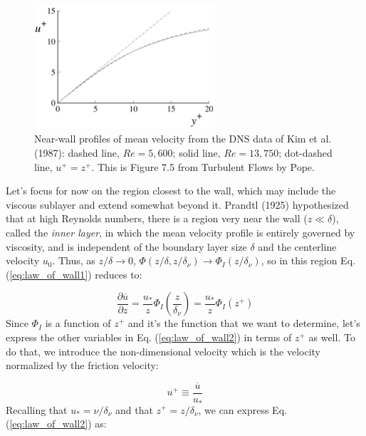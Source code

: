 \documentclass[12pt]{article}
\numberwithin{equation}{section}
\numberwithin{figure}{section}
\numberwithin{table}{section}
\begin{document}
\begin{figure}[h]
  \centering
  \includegraphics[width=0.6\textwidth]{assets/fig_law_of_the_wall_viscous_sublayer.png}
  \caption{
    Near-wall profiles of mean velocity from the DNS data of Kim et al. (1987):
    dashed line, $Re = 5,600$; solid line, $Re = 13,750$; dot-dashed line,
    $u^+ = z^+$.
    This is Figure 7.5 from Turbulent Flows by Pope.
  }
  \label{fig:law_of_the_wall_viscous_sublayer}
\end{figure}

Let's focus for now on the region closest to the wall, which may include the
viscous sublayer and extend somewhat beyond it.
Prandtl (1925) hypothesized that at high Reynolds numbers, there is a region
very near the wall ($z \ll \delta$), called the \textit{inner layer}, in which
the mean velocity profile is entirely governed by viscosity, and is independent
of the boundary layer size $\delta$ and the centerline velocity $u_0$.
Thus, as $z/\delta \to 0$, $\Phi(z/\delta, z/\delta_\nu) \to \Phi_I(z/\delta_\nu)$,
so in this region Eq. (\ref{eq:law_of_wall1}) reduces to:

\begin{equation}
  \frac{\partial \overline{u}}{\partial z} =
  \frac{u_*}{z} \Phi_I\left(\frac{z}{\delta_\nu}\right) =
  \frac{u_*}{z} \Phi_I\left(z^+\right)
  \label{eq:law_of_wall2}
\end{equation}
Since $\Phi_I$ is a function of $z^+$ and it's the function that we want to
determine, let's express the other variables in Eq. (\ref{eq:law_of_wall2}) in
terms of $z^+$ as well.
To do that, we introduce the non-dimensional velocity which is the velocity
normalized by the friction velocity:

\begin{equation}
  u^+ \equiv \frac{\overline{u}}{u_*}
\end{equation}
Recalling that $u_* = \nu/\delta_\nu$ and that $z^+ = z/\delta_\nu$, we can
express Eq. (\ref{eq:law_of_wall2}) as:
\end{document}
